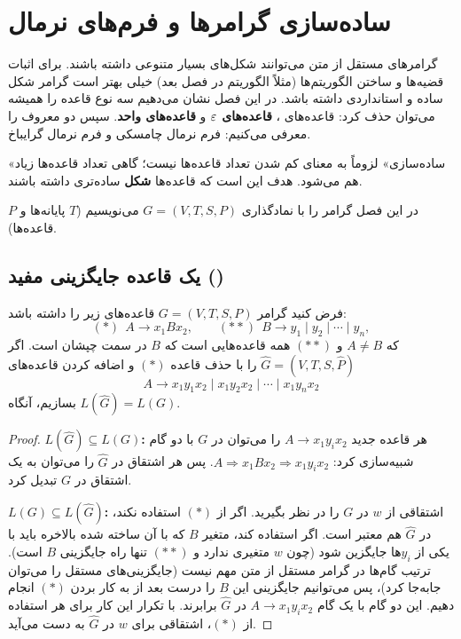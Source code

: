\chapter{ساده‌سازی گرامرها و فرم‌های نرمال}

گرامرهای مستقل از متن می‌توانند شکل‌های بسیار متنوعی داشته باشند. برای اثبات قضیه‌ها و ساختن الگوریتم‌ها (مثلاً الگوریتم  در فصل بعد) خیلی بهتر است گرامر شکل ساده و استانداردی داشته باشد. در این فصل نشان می‌دهیم سه نوع قاعده را همیشه می‌توان حذف کرد: قاعده‌های ، \textbf{قاعده‌های $\varepsilon$} و \textbf{قاعده‌های واحد}. سپس دو  معروف را معرفی می‌کنیم: فرم نرمال چامسکی و فرم نرمال گرایباخ.

\begin{note}
«ساده‌سازی» لزوماً به معنای کم شدن تعداد قاعده‌ها نیست؛ گاهی تعداد قاعده‌ها زیاد هم می‌شود. هدف این است که قاعده‌ها \textbf{شکل} ساده‌تری داشته باشند.
\end{note}

در این فصل گرامر را با نمادگذاری $G=(V,T,S,P)$ می‌نویسیم ($T$ پایانه‌ها و $P$ قاعده‌ها).

\section{یک قاعده جایگزینی مفید ()}

\begin{theorem}\label{thm:subst}
فرض کنید گرامر $G=(V,T,S,P)$ قاعده‌های زیر را داشته باشد:
\[(\ast)\ \ A\to x_1Bx_2,\qquad(\ast\ast)\ \ B\to y_1\mid y_2\mid\cdots\mid y_n,\]
که $A\neq B$ و $(\ast\ast)$ همه قاعده‌هایی است که $B$ در سمت چپشان است. اگر $\widehat G=(V,T,S,\widehat P)$ را با حذف قاعده $(\ast)$ و اضافه کردن قاعده‌های
\[A\to x_1y_1x_2\mid x_1y_2x_2\mid\cdots\mid x_1y_nx_2\]
بسازیم، آنگاه $L(\widehat G)=L(G)$.
\end{theorem}
\begin{proof}
\textbf{$L(\widehat G)\subseteq L(G)$:} هر قاعده جدید $A\to x_1y_ix_2$ را می‌توان در $G$ با دو گام شبیه‌سازی کرد: $A\Rightarrow x_1Bx_2\Rightarrow x_1y_ix_2$. پس هر اشتقاق در $\widehat G$ را می‌توان به یک اشتقاق در $G$ تبدیل کرد.

\textbf{$L(G)\subseteq L(\widehat G)$:} اشتقاقی از $w$ در $G$ را در نظر بگیرید. اگر از $(\ast)$ استفاده نکند، در $\widehat G$ هم معتبر است. اگر استفاده کند، متغیر $B$ که با آن ساخته شده بالاخره باید با یکی از $y_i$ها جایگزین شود (چون $w$ متغیری ندارد و $(\ast\ast)$ تنها راه جایگزینی $B$ است). ترتیب گام‌ها در گرامر مستقل از متن مهم نیست (جایگزینی‌های مستقل را می‌توان جابه‌جا کرد)، پس می‌توانیم جایگزینی این $B$ را درست بعد از به کار بردن $(\ast)$ انجام دهیم. این دو گام با یک گام $A\to x_1y_ix_2$ در $\widehat G$ برابرند. با تکرار این کار برای هر استفاده از $(\ast)$، اشتقاقی برای $w$ در $\widehat G$ به دست می‌آید.
\end{proof}

